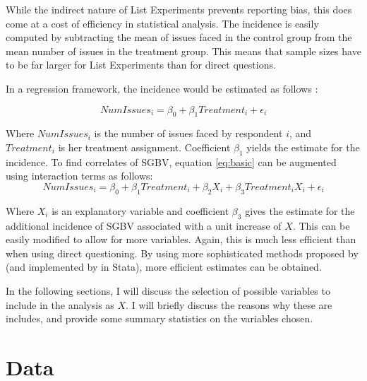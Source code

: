 \documentclass[10pt,a4paper]{scrartcl} %
\newcommand{\tableloc}{C:/Users/Koen/Dropbox/PhD/Papers/CongoGBV/Tables}
\begin{document}
While the indirect nature of List Experiments prevents reporting bias, this does come at a cost of efficiency in statistical analysis. The incidence is easily computed by subtracting the mean of issues faced in the control group from the mean number of issues in the treatment group. This means that sample sizes have to be far larger for List Experiments than for direct questions. 

In a regression framework, the incidence would be estimated as follows \cite{Holbrook2010}:

\begin{equation}
\label{eq:basic}
NumIssues_i = \beta_0 + \beta_1 Treatment_i + \epsilon_i
\end{equation}

Where \(NumIssues_i\) is the number of issues faced by respondent $i$, and \(Treatment_i\) is her treatment assignment. Coefficient \(\beta_1\) yields the estimate for the incidence. To find correlates of SGBV, equation \ref{eq:basic} can be augmented using interaction terms as follows: 
\begin{equation}
\label{eq:interaction}
NumIssues_i = \beta_0 + \beta_1 Treatment_i + \beta_2 X_i + \beta_3 Treatment_i X_i + \epsilon_i
\end{equation}

Where \(X_i\) is an explanatory variable and coefficient \(\beta_3\) gives the estimate for the additional incidence of SGBV associated with a unit increase of \(X\). This can be easily modified to allow for more variables. Again, this is much less efficient than when using direct questioning. By using more sophisticated methods proposed by \citet{Imai2011} (and implemented by \cite{Tsai2019} in Stata), more efficient estimates can be obtained. 

In the following sections, I will discuss the selection of possible variables to include in the analysis as $X$. I will briefly discuss the reasons why these are includes, and provide some summary statistics on the variables chosen.





\section*{Data}
\end{document}
